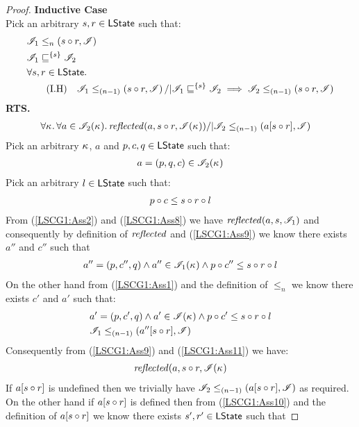 \begin{lemma}
\begin{proof}
\noindent\textbf{Inductive Case}\\
Pick an arbitrary $s, r \in \textsf{LState}$ such that:
\begin{align}
	&\isContainedAM{\lmod_1}{n}{s \composeL r}{\lmod} \label{LSCG1:Ass1}\\
	&\lmod_1 \weakenI{\{s\}} \lmod_2 \label{LSCG1:Ass2}\\
%		
	&	\for{s, r \in \LStates}  \nonumber\\
	& \tag{I.H} 
		\quad \isContainedAM{\lmod_1}{(n-1)}{s \composeL r}{\lmod} /| \lmod_1 \weakenI{\{s\}} \lmod_2 \implies \isContainedAM{\lmod_2}{(n-1)}{s \composeL r}{\lmod} \label{LSCG1:IH}
\end{align}
%
\textbf{RTS. } 
%
\begin{align}
  &\forall \kappa_{}.\,\forall a\in \mathscr{I}_2(\kappa_{}).\,
		\mathit{reflected}(a,s \circ r, \mathscr{I}(\kappa_{})) /| \mathscr{I}_2 \leq_{(n-1)}\left(a[s \circ r], \mathscr{I}\right) \label{LSCG1:Goal3}
\end{align}
%
Pick an arbitrary $\kappa_{}$, $a$ and $p, c, q\in \textsf{LState}$ such that:
%
\begin{align}
	a = (p, q, c) \in \mathscr{I}_2(\kappa_{}) \label{LSCG1:Ass8}
\end{align}
%
Pick an arbitrary $l \in \textsf{LState}$ such that:
%
\begin{align}
	p \circ c \leq s \circ r \circ l \label{LSCG1:Ass9}
\end{align}
%
From (\ref{LSCG1:Ass2}) and (\ref{LSCG1:Ass8}) we have $\mathit{reflected}(a, s, \mathscr{I}_1)$ and consequently by definition of $\mathit{reflected}$ and (\ref{LSCG1:Ass9}) we know there exists $a''$ and $c''$ such that 
%
\begin{align}
	a'' = (p, c'', q) \land a'' \in \mathscr{I}_1(\kappa_{}) \land p \circ c'' \leq s \circ r \circ l \label{LSCG1:Ass10}
\end{align}
%
On the other hand from (\ref{LSCG1:Ass1}) and the definition of $\leq_n$ we know there exists $c'$ and $a'$ such that:
%
\begin{align}
	& a' = (p, c', q) \land a' \in \mathscr{I}(\kappa_{}) \land p \circ c' \leq s \circ r \circ l \label{LSCG1:Ass11}\\
	& \mathscr{I}_1 \leq_{(n-1)}\left(a''[s \circ r], \mathscr{I}\right) \label{LSCG1:Ass12}
\end{align}
%
Consequently from (\ref{LSCG1:Ass9}) and (\ref{LSCG1:Ass11}) we have:
%
\begin{align*}
	\mathit{reflected}(a, s \circ r, \mathscr{I}(\kappa_{})
\end{align*}
% 
If $a[s \circ r]$ is undefined then we trivially have $\mathscr{I}_2 \leq_{(n-1)}\left(a[s \circ r], \mathscr{I}\right)$ as required. On the other hand if $a[s \circ r]$ is defined then from (\ref{LSCG1:Ass10}) and the definition of $a[s \circ r]$ we know there exists $s', r' \in \textsf{LState}$ such that  

\end{proof}
\end{lemma}
